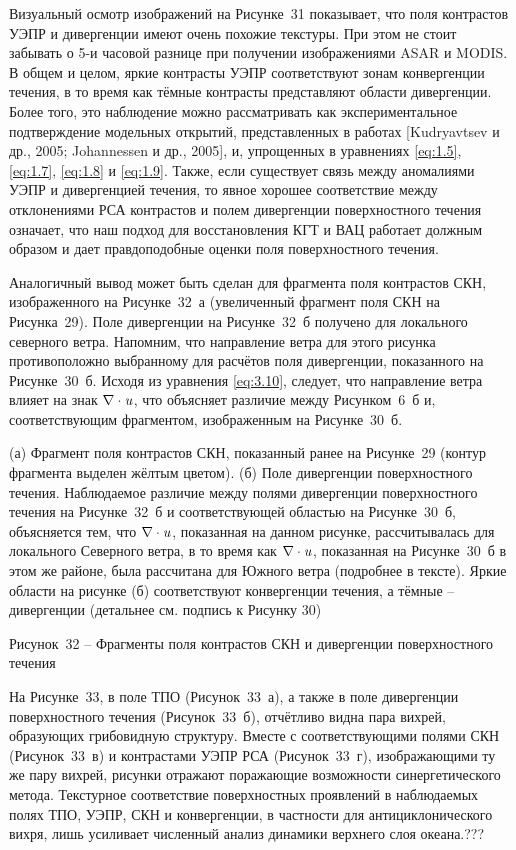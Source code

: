 Визуальный осмотр изображений на Рисунке~31 показывает, что поля контрастов УЭПР и дивергенции имеют очень похожие текстуры. При этом не стоит забывать о 5-и часовой разнице при получении изображениями ASAR и MODIS. В общем и целом, яркие контрасты УЭПР соответствуют зонам конвергенции течения, в то время как тёмные контрасты представляют области дивергенции. Более того, это наблюдение можно рассматривать как экспериментальное подтверждение модельных открытий, представленных в работах [Kudryavtsev и др., 2005; Johannessen и др., 2005], и, упрощенных в уравнениях \eqref{eq:1.5}, \eqref{eq:1.7}, \eqref{eq:1.8} и \eqref{eq:1.9}. Также, если существует связь между аномалиями УЭПР и дивергенцией течения, то явное хорошее соответствие между отклонениями РСА контрастов и полем дивергенции поверхностного течения означает, что наш подход для восстановления КГТ и ВАЦ работает должным образом и дает правдоподобные оценки поля поверхностного течения.

Аналогичный вывод может быть сделан для фрагмента поля контрастов СКН, изображенного на Рисунке~32~а (увеличенный фрагмент поля СКН на Рисунка~29). Поле дивергенции на Рисунке~32~б получено для локального северного ветра. Напомним, что направление ветра для этого рисунка противоположно выбранному для расчётов поля дивергенции, показанного на Рисунке~30~б. Исходя из уравнения \eqref{eq:3.10}, следует, что направление ветра влияет на знак $\nabla \cdot {\it u}$, что объясняет различие между Рисунком~6~б и, соответствующим фрагментом, изображенным на Рисунке~30~б.



(а) Фрагмент поля контрастов СКН, показанный ранее на Рисунке~29 (контур фрагмента выделен жёлтым цветом). (б) Поле дивергенции поверхностного течения. Наблюдаемое различие между полями дивергенции поверхностного течения на Рисунке~32~б и соответствующей областью на Рисунке~30~б, объясняется тем, что $\nabla \cdot {\it u}$, показанная на данном рисунке, рассчитывалась для локального Северного ветра, в то время как $\nabla \cdot {\it u}$, показанная на Рисунке~30~б в этом же районе, была рассчитана для Южного ветра (подробнее в тексте). Яркие области на рисунке (б) соответствуют конвергенции течения, а тёмные -- дивергенции (детальнее см. подпись к Рисунку 30)



Рисунок~32 -- Фрагменты поля контрастов СКН и дивергенции поверхностного течения



На Рисунке~33, в поле ТПО (Рисунок~33~а), а также в поле дивергенции поверхностного течения (Рисунок~33~б), отчётливо видна пара вихрей, образующих грибовидную структуру. Вместе с соответствующими полями СКН (Рисунок~33~в) и контрастами УЭПР РСА (Рисунок~33~г), изображающими ту же пару вихрей, рисунки отражают поражающие возможности синергетического метода. Текстурное соответствие поверхностных проявлений в наблюдаемых полях ТПО, УЭПР, СКН и конвергенции, в частности для антициклонического вихря, лишь усиливает численный анализ динамики верхнего слоя океана.???



